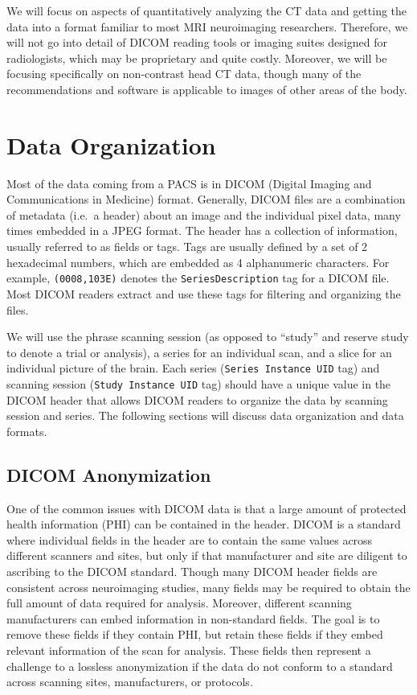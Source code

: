 \documentclass[]{elsarticle} %
\begin{document}
We will focus on aspects of quantitatively analyzing the CT data and getting the data into a format familiar to most MRI neuroimaging researchers. Therefore, we will not go into detail of DICOM reading tools or imaging suites designed for radiologists, which may be proprietary and quite costly. Moreover, we will be focusing specifically on non-contrast head CT data, though many of the recommendations and software is applicable to images of other areas of the body.

\hypertarget{data-organization}{%
\section{Data Organization}\label{data-organization}}

Most of the data coming from a PACS is in DICOM (Digital Imaging and Communications in Medicine) format. Generally, DICOM files are a combination of metadata (i.e.~a header) about an image and the individual pixel data, many times embedded in a JPEG format. The header has a collection of information, usually referred to as fields or tags. Tags are usually defined by a set of 2 hexadecimal numbers, which are embedded as 4 alphanumeric characters. For example, \texttt{(0008,103E)} denotes the \texttt{SeriesDescription} tag for a DICOM file. Most DICOM readers extract and use these tags for filtering and organizing the files.

We will use the phrase scanning session (as opposed to ``study'' and reserve study to denote a trial or analysis), a series for an individual scan, and a slice for an individual picture of the brain. Each series (\texttt{Series\ Instance\ UID} tag) and scanning session (\texttt{Study\ Instance\ UID} tag) should have a unique value in the DICOM header that allows DICOM readers to organize the data by scanning session and series. The following sections will discuss data organization and data formats.

\hypertarget{dicom-anonymization}{%
\subsection{DICOM Anonymization}\label{dicom-anonymization}}

One of the common issues with DICOM data is that a large amount of protected health information (PHI) can be contained in the header. DICOM is a standard where individual fields in the header are to contain the same values across different scanners and sites, but only if that manufacturer and site are diligent to ascribing to the DICOM standard. Though many DICOM header fields are consistent across neuroimaging studies, many fields may be required to obtain the full amount of data required for analysis. Moreover, different scanning manufacturers can embed information in non-standard fields. The goal is to remove these fields if they contain PHI, but retain these fields if they embed relevant information of the scan for analysis. These fields then represent a challenge to a lossless anonymization if the data do not conform to a standard across scanning sites, manufacturers, or protocols.
\end{document}
